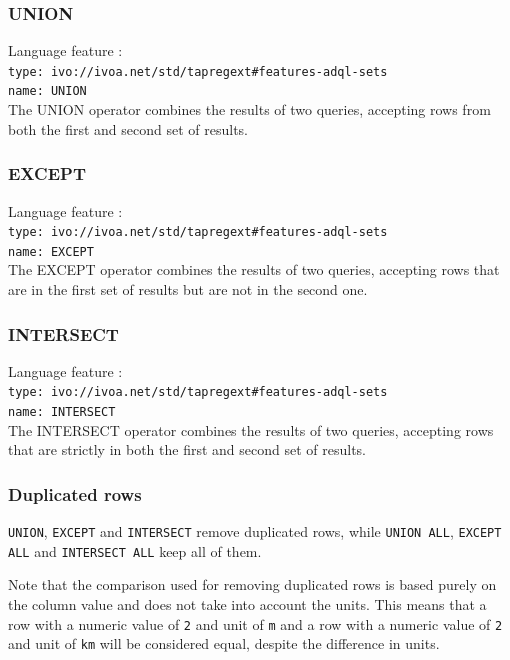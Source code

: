 \documentclass[11pt,a4paper]{ivoa}
\begin{document}
\subsubsection{UNION}
{\footnotesize Language feature :}\\
{\footnotesize \verb|type: ivo://ivoa.net/std/tapregext#features-adql-sets|}\\
{\footnotesize \verb|name: UNION|}\\

The UNION operator combines the results of two queries, accepting rows from
both the first and second set of results.

\subsubsection{EXCEPT}
{\footnotesize Language feature :}\\
{\footnotesize \verb|type: ivo://ivoa.net/std/tapregext#features-adql-sets|}\\
{\footnotesize \verb|name: EXCEPT|}\\

The EXCEPT operator combines the results of two queries, accepting rows that are
in the first set of results but are not in the second one.

\subsubsection{INTERSECT}
{\footnotesize Language feature :}\\
{\footnotesize \verb|type: ivo://ivoa.net/std/tapregext#features-adql-sets|}\\
{\footnotesize \verb|name: INTERSECT|}\\

The INTERSECT operator combines the results of two queries, accepting rows
that are strictly in both the first and second set of results.

\subsubsection{Duplicated rows}

\verb:UNION:, \verb:EXCEPT: and \verb:INTERSECT: remove duplicated rows,
while \verb:UNION ALL:, \verb:EXCEPT ALL: and \verb:INTERSECT ALL: keep all of
them.

Note that the comparison used for removing duplicated rows is based purely on
the column value and does not take into account the units. This means that a row
with a numeric value of \verb:2: and unit of \verb:m: and a row with a numeric
value of \verb:2: and unit of \verb:km: will be considered equal, despite the
difference in units.
\end{document}
